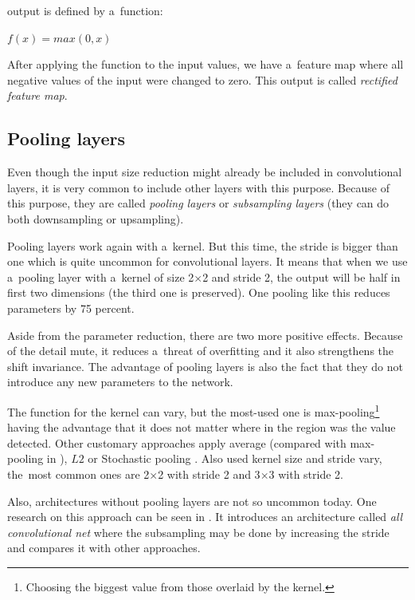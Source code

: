  output is defined by a~function:

$f(x) = max(0, x)$

After applying the  function to the input values, we have a~feature 
map where all negative values of the input were changed to zero. This output is
called \textit{rectified feature map}. 

\subsection{Pooling layers}
\label{pooling}

Even though the input size reduction might already be included in convolutional
layers, it is very common to include other layers with this purpose. Because 
of this purpose, they are called \textit{pooling layers} or \textit{subsampling
layers} (they can do both downsampling or upsampling). 

Pooling layers work again with a~kernel. But this time, the stride is bigger 
than one which is quite uncommon for convolutional layers. It means that when
we use a~pooling layer with a~kernel of size 2$\times$2 and stride 2, the
output will be half in first two dimensions (the third one is preserved). One
pooling like this reduces parameters by 75 percent. 

Aside from the parameter reduction, there are two more positive effects.
Because of the detail mute, it reduces a~threat of overfitting and it also
strengthens the shift invariance. The advantage of pooling layers is also the
fact that they do not introduce any new parameters to the network. 

The function for the kernel can vary, but the most-used one is 
max-pooling\footnote{Choosing the biggest value from those overlaid by the 
kernel.} having the advantage that it does not matter where in the region was 
the value detected. Other customary approaches apply average (compared with 
max-pooling in \cite{avg-pooling}), $L2$ \cite{l2-pooling} or Stochastic
pooling \cite{stoch-pooling}. Also used kernel size and stride vary, the~most
common ones are 2$\times$2 with stride 2 and 3$\times$3 with stride 2. 

Also, architectures without pooling layers are not so uncommon today. One 
research on this approach can be seen in \cite{all-conv-net}. It introduces an 
architecture called \textit{all convolutional net} where the subsampling may be
done by increasing the stride and compares it with other approaches. 

